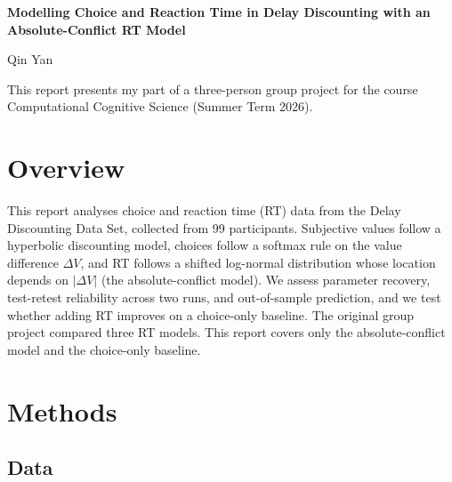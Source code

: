 \documentclass[11pt,a4paper]{article}
\begin{document}
	
	\begin{center}
		{\large\bfseries Modelling Choice and Reaction Time in Delay Discounting with an Absolute-Conflict RT Model}
		
		\vspace{0.4em}
		Qin Yan
		
		\vspace{0.8em}
		This report presents my part of a three-person group project for the course Computational Cognitive Science (Summer Term 2026).
	\end{center}
	
	\vspace{1.2em}
	
	\section{Overview}
	
	This report analyses choice and reaction time (RT) data from the Delay Discounting Data Set, collected from 99 participants. Subjective values follow a hyperbolic discounting model, choices follow a softmax rule on the value difference $\Delta V$, and RT follows a shifted log-normal distribution whose location depends on $|\Delta V|$ (the absolute-conflict model). We assess parameter recovery, test-retest reliability across two runs, and out-of-sample prediction, and we test whether adding RT improves on a choice-only baseline. The original group project compared three RT models. This report covers only the absolute-conflict model and the choice-only baseline.
	
	\section{Methods}
	
	\subsection{Data}
	
\end{document}
